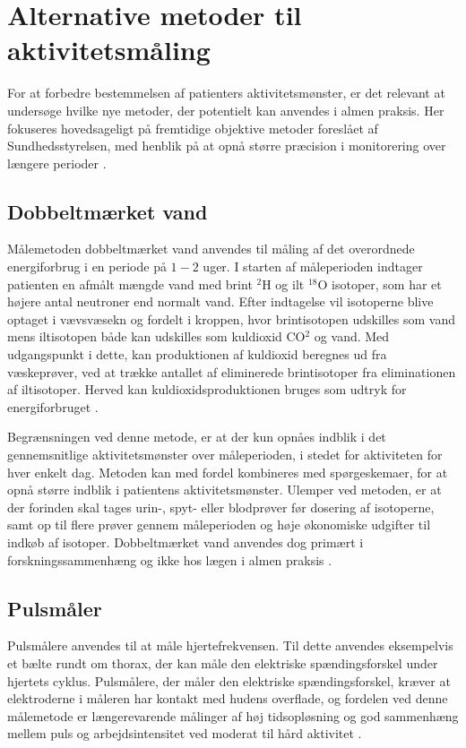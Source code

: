 \section{Alternative metoder til aktivitetsmåling}

For at forbedre bestemmelsen af patienters aktivitetsmønster, er det relevant at undersøge hvilke nye metoder, der potentielt kan anvendes i almen praksis. Her fokuseres hovedsageligt på fremtidige objektive metoder foreslået af Sundhedsstyrelsen, med henblik på at opnå større præcision i monitorering over længere perioder \citep{motionsraad2007}.

\subsection{Dobbeltmærket vand}

Målemetoden dobbeltmærket vand anvendes til måling af det overordnede energiforbrug i en periode på $1-2$ uger. I starten af måleperioden indtager patienten en afmålt mængde vand med brint  $^2$H og ilt $^{18}$O isotoper, som har et højere antal neutroner end normalt vand. Efter indtagelse vil isotoperne blive optaget i vævsvæsekn og fordelt i kroppen, hvor brintisotopen udskilles som vand mens iltisotopen både kan udskilles som kuldioxid CO$^2$ og vand. Med udgangspunkt i dette, kan produktionen af kuldioxid beregnes ud fra væskeprøver, ved at trække antallet af eliminerede brintisotoper fra eliminationen af iltisotoper. Herved kan kuldioxidsproduktionen bruges som udtryk for energiforbruget \citep{motionsraad2007,pedersen2011}.

Begrænsningen ved denne metode, er at der kun opnåes indblik i det gennemsnitlige aktivitetsmønster over måleperioden, i stedet for aktiviteten for hver enkelt dag. Metoden kan med fordel kombineres med spørgeskemaer, for at opnå større indblik i patientens aktivitetsmønster. 
Ulemper ved metoden, er at der forinden skal tages urin-, spyt- eller blodprøver før dosering af isotoperne, samt op til flere prøver gennem måleperioden og høje økonomiske udgifter til indkøb af isotoper. Dobbeltmærket vand anvendes dog primært i forskningssammenhæng og ikke hos lægen i almen praksis \citep{motionsraad2007}.

\subsection{Pulsmåler}

Pulsmålere anvendes til at måle hjertefrekvensen. Til dette anvendes eksempelvis et bælte rundt om thorax, der kan måle den elektriske spændingsforskel under hjertets cyklus. Pulsmålere, der måler den elektriske spændingsforskel, kræver at elektroderne i måleren har kontakt med hudens overflade, og fordelen ved denne målemetode er længerevarende målinger af høj tidsopløsning og god sammenhæng mellem puls og arbejdsintensitet ved moderat til hård aktivitet \citep{motionsraad2007}. 


